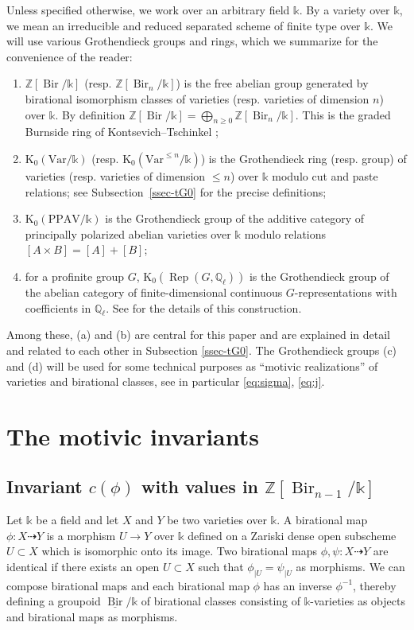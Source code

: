 \documentclass[a4paper,12pt]{amsart}
\def\k{\mathbb k}
\def\Q{\mathbb Q}
\def\Z{\mathbb Z}
\def\Bir{{\operatorname{Bir}}}
\def\Rep{{\operatorname{Rep}}}
\def\Kt{{\mathrm{K}}}
\def\PPAV{{\mathrm{PPAV}}}
\def\Var{{\mathrm{Var}}}
\theoremstyle{plain}
\numberwithin{equation}{section}
\theoremstyle{definition}
\newcommand{\ssec}{\subsection}
\newcommand{\ul}{\underline}
\renewcommand{\(}{\left(}
\renewcommand{\)}{\right)}
\newcommand{\dto}{\dashrightarrow}
\begin{document}
Unless specified otherwise, we work over an arbitrary field $\k$.
By a variety over $\k$,
we mean
an 
irreducible
and reduced separated
scheme
of finite type over $\k$.
We will use various Grothendieck groups and rings, which we summarize for the convenience of the reader:
\begin{enumerate}
\item[(a)] $\Z[\Bir/\k]$ (resp. $\Z[\Bir_n/\k]$) 
is the free abelian group generated by birational isomorphism classes of varieties 
(resp. varieties of dimension $n$)
over $\k$.
By definition 
$\Z[\Bir/\k] = \bigoplus_{n \ge 0}
\Z[\Bir_n/\k]$. This is the graded Burnside ring of Kontsevich--Tschinkel \cite{KontsevichTschinkel};
\item[(b)] $\Kt_0(\Var/\k)$ 
(resp. $\Kt_0(\Var^{\le n}/\k)$)
is the Grothendieck ring (resp. group)
of varieties (resp. varieties of dimension $\le n$)
over $\k$
modulo cut and paste relations; 
see Subsection~\ref{ssec-tG0} for the precise definitions;
\item[(c)] $\Kt_0(\PPAV/\k)$ is the Grothendieck group of the additive category of 
principally polarized abelian varieties over $\k$
modulo relations $[A \times B] = [A] + [B]$;
\item[(d)] for a profinite group
$G$, $\Kt_0(\Rep(G, \Q_\ell))$
is the Grothendieck group of
the abelian category of
finite-dimensional
continuous $G$-representations 
with coefficients in $\Q_\ell$. See \cite[Section 2.1]{LSZ20} for the details of this construction.
\end{enumerate}
Among these,  (a) and (b)
are central for this paper and
are explained in detail and 
related to each other in Subsection \ref{ssec-tG0}.
The Grothendieck groups (c) and (d)
will be used for some technical purposes
as ``motivic realizations'' of varieties and birational classes,
see in particular \eqref{eq:sigma}, \eqref{eq:j}.


\section{The motivic invariants}
\label{sec:invariants}



\ssec{Invariant $c(\phi)$ with values in $\Z[\Bir_{n-1}/\k]$}
\hfill

Let $\k$ be a field and
let $X$ and $Y$ be two varieties over $\k$.
A birational map $\phi : X \dto Y$
is a morphism $U \to Y$ over $\k$
defined on a Zariski dense open subscheme
$U \subset X$
which is isomorphic onto its image.
Two birational maps $\phi,\psi : X \dto Y$
are identical
if there exists an open 
$U \subset X$ such that $\phi_{|U} = \psi_{|U}$
as morphisms.
We can compose birational maps and each
birational map $\phi$ has an inverse $\phi^{-1}$,
thereby defining a
groupoid $\ul{\Bir}/\k$ of birational classes
consisting of $\k$-varieties as objects
and birational maps as morphisms.
\end{document}
